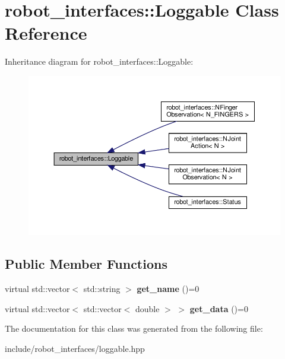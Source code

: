 \hypertarget{classrobot__interfaces_1_1Loggable}{}\section{robot\+\_\+interfaces\+:\+:Loggable Class Reference}
\label{classrobot__interfaces_1_1Loggable}


Inheritance diagram for robot\+\_\+interfaces\+:\+:Loggable\+:
\nopagebreak
\begin{figure}[H]
\begin{center}
\leavevmode
\includegraphics[width=350pt]{classrobot__interfaces_1_1Loggable__inherit__graph}
\end{center}
\end{figure}
\subsection*{Public Member Functions}
\begin{DoxyCompactItemize}
\item 
\mbox{\label{classrobot__interfaces_1_1Loggable_a19635ebc166379f11fe4c8e58153243a}} 
virtual std\+::vector$<$ std\+::string $>$ {\bfseries get\+\_\+name} ()=0
\item 
\mbox{\label{classrobot__interfaces_1_1Loggable_a28ffee45cf66a84d16b2c907ed10367c}} 
virtual std\+::vector$<$ std\+::vector$<$ double $>$ $>$ {\bfseries get\+\_\+data} ()=0
\end{DoxyCompactItemize}


The documentation for this class was generated from the following file\+:\begin{DoxyCompactItemize}
\item 
include/robot\+\_\+interfaces/loggable.\+hpp\end{DoxyCompactItemize}

